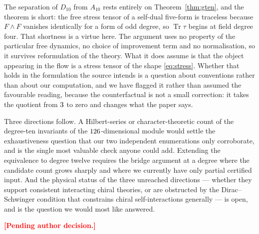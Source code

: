 \documentclass[
  aps,prd,
  reprint,
  letterpaper,
  amsmath,amssymb,
  nofootinbib,
  superscriptaddress
]{revtex4-2}
\theoremstyle{plain}
\newcommand{\Ften}{A_{10}}
\newcommand{\Dten}{D_{10}}
\newcommand{\pending}[1]{\textcolor{red}{\textbf{[#1]}}}
\begin{document}
The separation of $\Dten$ from $\Ften$ rests entirely on
Theorem~\ref{thm:gten}, and the theorem is short: the free stress tensor of a
self-dual five-form is traceless because $F\wedge F$ vanishes identically for a
form of odd degree, so $\operatorname{Tr}\tau$ begins at field degree four. That
shortness is a virtue here. The argument uses no property of the particular free
dynamics, no choice of improvement term and no normalisation, so it survives
reformulation of the theory. What it does assume is that the object appearing in
the flow is a stress tensor of the shape \eqref{eq:stress}. Whether that holds
in the formulation the source intends is a question about conventions rather
than about our computation, and we have flagged it rather than assumed the
favourable reading, because the counterfactual is not a small correction: it
takes the quotient from $3$ to zero and changes what the paper says.

Three directions follow. A Hilbert-series or character-theoretic count of the
degree-ten invariants of the $126$-dimensional module would
settle the exhaustiveness question that our two independent enumerations only
corroborate, and is the single most valuable check anyone could add. Extending
the equivalence to degree twelve requires the bridge argument at a degree where
the candidate count grows sharply and where we currently have only partial
certified input. And the physical status of the three unreached directions ---
whether they support consistent interacting chiral theories, or are obstructed
by the Dirac--Schwinger condition that constrains chiral self-interactions
generally --- is open, and is the question we would most like answered.

\begin{acknowledgments}
\pending{Pending author decision.}
\end{acknowledgments}



\end{document}
